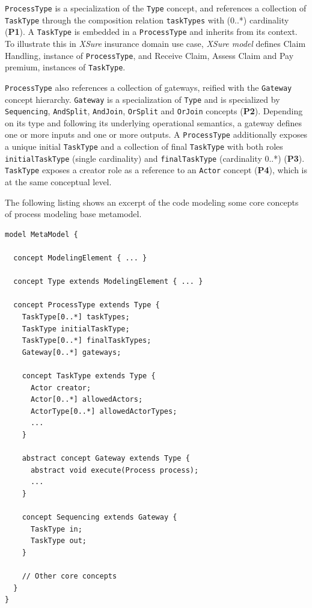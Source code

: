 \texttt{ProcessType} is a specialization of the \texttt{Type} concept, and references a collection of \texttt{TaskType} through the composition relation \texttt{taskTypes} with (0..*) cardinality (\textbf{P1}). A \texttt{TaskType} is embedded in a \texttt{ProcessType} and inherits from its context. To illustrate this in \textit{XSure} insurance domain use case, \textit{XSure model} defines \textsf{Claim Handling}, instance of \texttt{ProcessType}, and \textsf{Receive Claim}, \textsf{Assess Claim} and \textsf{Pay premium}, instances of \texttt{TaskType}.

\texttt{ProcessType} also references a collection of gateways, reified with the \texttt{Gateway} concept hierarchy. \texttt{Gateway} is a specialization of \texttt{Type} and is specialized by \texttt{Sequencing}, \texttt{AndSplit}, \texttt{AndJoin}, \texttt{OrSplit} and \texttt{OrJoin} concepts (\textbf{P2}). Depending on its type and following its underlying operational semantics, a gateway defines one or more inputs and one or more outputs. A \texttt{ProcessType} additionally exposes a unique initial \texttt{TaskType} and a collection of final \texttt{TaskType} with both roles \texttt{initialTaskType} (single cardinality) and \texttt{finalTaskType} (cardinality 0..*) (\textbf{P3}). \texttt{TaskType} exposes a creator role as a reference to an \texttt{Actor} concept (\textbf{P4}), which is at the same conceptual level. 

The following listing shows an excerpt of the \FML code modeling some core concepts of process modeling base metamodel. 

\begin{lstlisting}
model MetaModel {

  concept ModelingElement { ... }
  
  concept Type extends ModelingElement { ... }
  
  concept ProcessType extends Type {
    TaskType[0..*] taskTypes;
    TaskType initialTaskType;
    TaskType[0..*] finalTaskTypes;
    Gateway[0..*] gateways;
        
    concept TaskType extends Type {
      Actor creator;
      Actor[0..*] allowedActors;
      ActorType[0..*] allowedActorTypes;
      ...
    }
        
    abstract concept Gateway extends Type {
      abstract void execute(Process process);
      ...
    }
        
    concept Sequencing extends Gateway {
      TaskType in;
      TaskType out;
    }
    
    // Other core concepts
  }
}    
\end{lstlisting}


